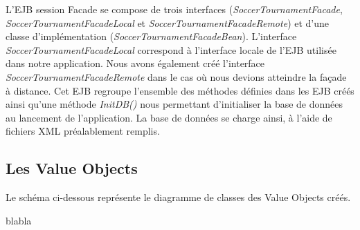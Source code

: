 \documentclass[10pt]{report}
\begin{document}
L'EJB session Facade se compose de trois interfaces (\textit{SoccerTournamentFacade}, \textit{SoccerTournamentFacadeLocal} et \textit{SoccerTournamentFacadeRemote}) et d'une classe d'implémentation (\textit{SoccerTournamentFacadeBean}). L'interface \textit{SoccerTournamentFacadeLocal} correspond à l'interface locale de l'EJB utilisée dans notre application. Nous avons également créé l'interface \textit{SoccerTournamentFacadeRemote} dans le cas où nous devions atteindre la façade à distance. Cet EJB regroupe l'ensemble des méthodes définies dans les EJB créés ainsi qu'une méthode \textit{InitDB()} nous permettant d'initialiser la base de données au lancement de l'application. La base de données se charge ainsi, à l'aide de fichiers XML préalablement remplis. 

\newpage
\subsection{Les Value Objects}

Le schéma ci-dessous représente le diagramme de classes des Value Objects créés.
	\begin{figure}[here]
	      \begin{center}
	      \end{center}
	\end{figure}
blabla

\newpage
\end{document}

